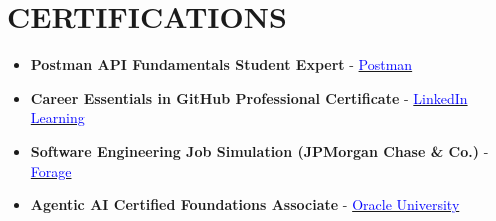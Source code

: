 \documentclass[letterpaper,10pt]{article}
\newcommand{\resumeItem}[1]{
  \item\small{
    {#1 \vspace{-5pt}}
  }
}
\begin{document}
\section{CERTIFICATIONS}
        \begin{itemize}[leftmargin=0.15in]
                \resumeItem{\textbf{Postman API Fundamentals Student Expert} - \href{https://badges.parchment.com/public/assertions/lIxz4kcZQTaRUQtREJsZpQ?utm_source=url_copy&identity__email=neerajrajputa786\%40gmail.com}{\textcolor{blue}{{{Postman}}}}}
                \vspace{2pt}
                \resumeItem{\textbf{Career Essentials in GitHub Professional Certificate} - \href{https://www.linkedin.com/learning/certificates/4a85c6690468afa066f430fa525001ebcffd6e3c5325a0a975996129719e2c53?trk=share_certificate}{\textcolor{blue}{{{LinkedIn Learning}}}}}
                \vspace{2pt}
                \resumeItem{\textbf{Software Engineering Job Simulation (JPMorgan Chase \& Co.)} - \href{https://forage-uploads-prod.s3.amazonaws.com/completion-certificates/Sj7temL583QAYpHXD/E6McHJDKsQYh79moz_Sj7temL583QAYpHXD_aogdzJM8wDbRy2ZC2_1750582758154_completion_certificate.pdf}{\textcolor{blue}{{{Forage}}}}}
                \vspace{2pt}
                \resumeItem{\textbf{Agentic AI Certified Foundations Associate} - \href{https://brm-certview.oracle.com/ords/certview/ecertificate?ssn=OC8152734&trackId=AAI26OFA&key=535d12b87a5f36546818d2df620e56fc0e7fac07}{\textcolor{blue}{{{Oracle University}}}}}
                
        \end{itemize}
 \vspace{-8pt}

\end{document}
